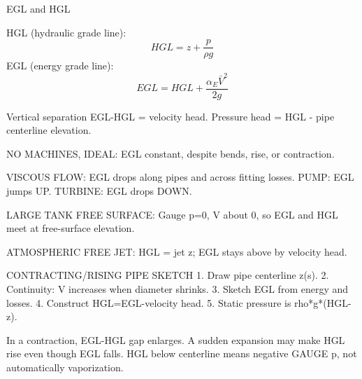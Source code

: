 EGL and HGL

HGL (hydraulic grade line):
$$HGL=z+\frac{p}{\rho g}$$
EGL (energy grade line):
$$EGL=HGL+\frac{\alpha_E\bar V^2}{2g}$$

Vertical separation EGL-HGL = velocity head.
Pressure head = HGL - pipe centerline elevation.

NO MACHINES, IDEAL:
EGL constant, despite bends, rise, or contraction.

VISCOUS FLOW:
EGL drops along pipes and across fitting losses.
PUMP: EGL jumps UP.
TURBINE: EGL drops DOWN.

LARGE TANK FREE SURFACE:
Gauge p=0, V about 0, so EGL and HGL meet at free-surface elevation.

ATMOSPHERIC FREE JET:
HGL = jet z; EGL stays above by velocity head.

CONTRACTING/RISING PIPE SKETCH
1. Draw pipe centerline z(s).
2. Continuity: V increases when diameter shrinks.
3. Sketch EGL from energy and losses.
4. Construct HGL=EGL-velocity head.
5. Static pressure is rho*g*(HGL-z).

In a contraction, EGL-HGL gap enlarges.
A sudden expansion may make HGL rise even though EGL falls.
HGL below centerline means negative GAUGE p, not automatically vaporization.
